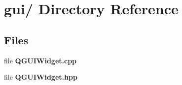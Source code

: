 \section{gui/ Directory Reference}
\label{dir_000005}
\subsection*{Files}
\begin{CompactItemize}
\item 
file {\bf QGUIWidget.cpp}
\item 
file {\bf QGUIWidget.hpp}
\end{CompactItemize}
